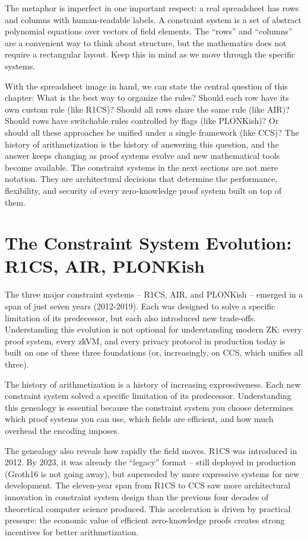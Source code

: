 \documentclass[
  11pt,
  openany]{report}
\begin{document}
The metaphor is imperfect in one important respect: a real spreadsheet has rows
and columns with human-readable labels. A constraint system is a set of abstract
polynomial equations over vectors of field elements. The ``rows'' and
``columns'' are a convenient way to think about structure, but the mathematics
does not require a rectangular layout. Keep this in mind as we move through the
specific systems.

With the spreadsheet image in hand, we can state the central question of this
chapter: What is the best way to organize the rules? Should each row have its
own custom rule (like R1CS)? Should all rows share the same rule (like AIR)?
Should rows have switchable rules controlled by flags (like PLONKish)? Or should
all these approaches be unified under a single framework (like CCS)? The history
of arithmetization is the history of answering this question, and the answer
keeps changing as proof systems evolve and new mathematical tools become
available. The constraint systems in the next sections are not mere notation.
They are architectural decisions that determine the performance, flexibility,
and security of every zero-knowledge proof system built on top of them.

\section{The Constraint System Evolution: R1CS, AIR,
PLONKish}\label{the-constraint-system-evolution-r1cs-air-plonkish}

The three major constraint systems -- R1CS, AIR, and PLONKish -- emerged in a
span of just seven years (2012-2019). Each was designed to solve a specific
limitation of its predecessor, but each also introduced new trade-offs.
Understanding this evolution is not optional for understanding modern ZK: every
proof system, every zkVM, and every privacy protocol in production today is
built on one of these three foundations (or, increasingly, on CCS, which unifies
all three).

The history of arithmetization is a history of increasing expressiveness. Each
new constraint system solved a specific limitation of its predecessor.
Understanding this genealogy is essential because the constraint system you
choose determines which proof systems you can use, which fields are efficient,
and how much overhead the encoding imposes.

The genealogy also reveals how rapidly the field moves. R1CS was introduced in
2012. By 2023, it was already the ``legacy'' format -- still deployed in
production (Groth16 is not going away), but superseded by more expressive
systems for new development. The eleven-year span from R1CS to CCS saw more
architectural innovation in constraint system design than the previous four
decades of theoretical computer science produced. This acceleration is driven by
practical pressure: the economic value of efficient zero-knowledge proofs
creates strong incentives for better arithmetization.
\end{document}
